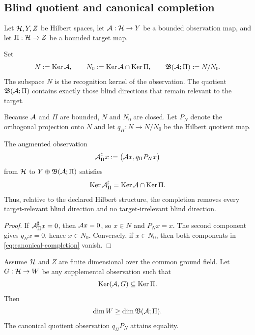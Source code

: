 \subsection{Blind quotient and canonical completion}

Let $\mathcal H,Y,Z$ be Hilbert spaces, let $\mathcal A:\mathcal H\to Y$ be a bounded observation map, and let $\Pi:\mathcal H\to Z$ be a bounded target map.

\begin{definition}
Set
\[
N:=\operatorname{Ker}\mathcal A,
\qquad
N_0:=\operatorname{Ker}\mathcal A\cap\operatorname{Ker}\Pi,
\qquad
\mathfrak B(\mathcal A;\Pi):=N/N_0.
\]
The subspace $N$ is the recognition kernel of the observation.  The quotient $\mathfrak B(\mathcal A;\Pi)$ contains exactly those blind directions that remain relevant to the target.
\end{definition}

Because $\mathcal A$ and $\Pi$ are bounded, $N$ and $N_0$ are closed.  Let $P_N$ denote the orthogonal projection onto $N$ and let $q_\Pi:N\to N/N_0$ be the Hilbert quotient map.

\begin{theorem}
The augmented observation
\begin{equation}
\mathcal A_\Pi^\sharp x
:=\bigl(\mathcal A x,q_\Pi P_Nx\bigr)
\label{eq:canonical-completion}
\end{equation}
from $\mathcal H$ to $Y\oplus\mathfrak B(\mathcal A;\Pi)$ satisfies
\begin{equation}
\operatorname{Ker}\mathcal A_\Pi^\sharp
=\operatorname{Ker}\mathcal A\cap\operatorname{Ker}\Pi.
\label{eq:completion-kernel}
\end{equation}
Thus, relative to the declared Hilbert structure, the completion removes every target-relevant blind direction and no target-irrelevant blind direction.
\end{theorem}

\begin{proof}
If $\mathcal A_\Pi^\sharp x=0$, then $\mathcal A x=0$, so $x\in N$ and $P_Nx=x$.  The second component gives $q_\Pi x=0$, hence $x\in N_0$.  Conversely, if $x\in N_0$, then both components in \eqref{eq:canonical-completion} vanish.
\end{proof}

\begin{theorem}
Assume $\mathcal H$ and $Z$ are finite dimensional over the common ground field.  Let $G:\mathcal H\to W$ be any supplemental observation such that
\[
\operatorname{Ker}(\mathcal A,G)\subseteq\operatorname{Ker}\Pi.
\]
Then
\begin{equation}
\dim W\ge\dim\mathfrak B(\mathcal A;\Pi).
\label{eq:min-repair-rank}
\end{equation}
The canonical quotient observation $q_\Pi P_N$ attains equality.
\end{theorem}

